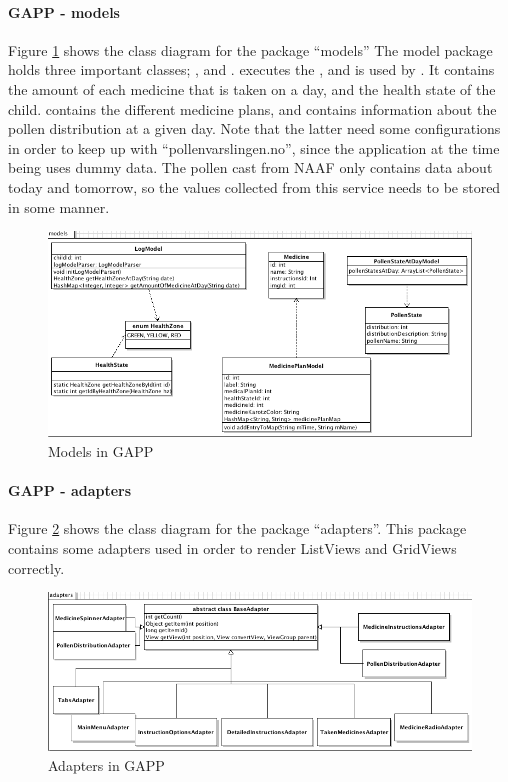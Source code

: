 \paragraph{GAPP - models}
Figure \ref{fig:class-diagram-parent-models} shows the class diagram for the package ``models''
The model package holds three important classes; ,  and .
 executes the , and is used by . It contains the amount of each medicine
that is taken on a day, and the health state of the child.  contains the different medicine plans, and 
contains information about the pollen distribution at a given day. Note that the latter need some configurations in order to keep up with
``pollenvarslingen.no'', since the application at the time being uses dummy data. The pollen cast from NAAF only contains data about today and tomorrow, so the values collected from this service needs
to be stored in some manner.  
\begin{figure}
	\centering
		\includegraphics[width = \linewidth]{Pictures/ArchPictures/models.png}
	\caption{Models in GAPP}
	\label{fig:class-diagram-parent-models}
\end{figure}

\paragraph{GAPP - adapters}
Figure \ref{fig:class-diagram-parent-adapters} shows the class diagram for the package ``adapters''.
This package contains some adapters used in order to render ListViews and GridViews correctly.
\begin{figure}
	\centering
		\includegraphics[width = \linewidth]{Pictures/ArchPictures/adapters.png}
	\caption{Adapters in GAPP}
	\label{fig:class-diagram-parent-adapters}
\end{figure}


